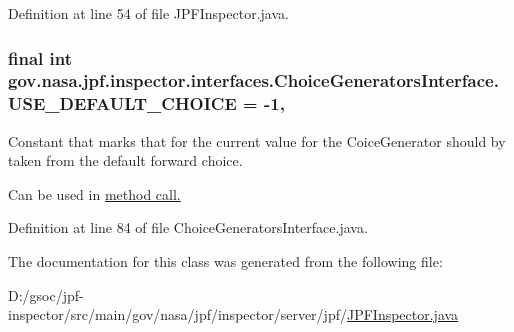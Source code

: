 Definition at line 54 of file J\+P\+F\+Inspector.\+java.

\subsubsection[{\texorpdfstring{U\+S\+E\+\_\+\+D\+E\+F\+A\+U\+L\+T\+\_\+\+C\+H\+O\+I\+CE}{USE_DEFAULT_CHOICE}}]{\setlength{\rightskip}{0pt plus 5cm}final int gov.\+nasa.\+jpf.\+inspector.\+interfaces.\+Choice\+Generators\+Interface.\+U\+S\+E\+\_\+\+D\+E\+F\+A\+U\+L\+T\+\_\+\+C\+H\+O\+I\+CE = -\/1\hspace{0.3cm}{\ttfamily [static]}, {\ttfamily [inherited]}}\hypertarget{interfacegov_1_1nasa_1_1jpf_1_1inspector_1_1interfaces_1_1_choice_generators_interface_ac57a2bb0eb101be2c2b27bd19cb81ea7}{}\label{interfacegov_1_1nasa_1_1jpf_1_1inspector_1_1interfaces_1_1_choice_generators_interface_ac57a2bb0eb101be2c2b27bd19cb81ea7}


Constant that marks that for the current value for the Coice\+Generator should by taken from the default forward choice. 

Can be used in \hyperlink{interfacegov_1_1nasa_1_1jpf_1_1inspector_1_1interfaces_1_1_choice_generators_interface_a055b8d48f863633614dee147bc607ed7}{method call. }

Definition at line 84 of file Choice\+Generators\+Interface.\+java.



The documentation for this class was generated from the following file\+:\begin{DoxyCompactItemize}
\item 
D\+:/gsoc/jpf-\/inspector/src/main/gov/nasa/jpf/inspector/server/jpf/\hyperlink{_j_p_f_inspector_8java}{J\+P\+F\+Inspector.\+java}\end{DoxyCompactItemize}
